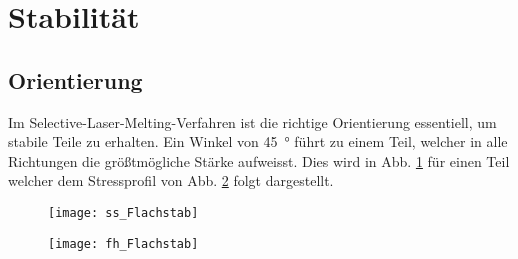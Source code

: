 \documentclass[../main.tex]{subfiles}
\begin{document}
\section{Stabilität}
\subsection{Orientierung}
Im Selective-Laser-Melting-Verfahren ist die richtige Orientierung essentiell, um stabile Teile zu erhalten.
Ein Winkel von \qty{45}{\degree} führt zu einem Teil, welcher in alle Richtungen die größtmögliche Stärke aufweisst. Dies wird in Abb. \ref{img:ss_1} für einen Teil welcher dem Stressprofil von Abb. \ref{img:fh_1} folgt dargestellt.

\begin{figure}[h]
	\centering
	\texttt{[image: ss\_Flachstab]}
	\label{img:ss_1}
\end{figure}
\begin{figure}[h]
	\centering
	\texttt{[image: fh\_Flachstab]}
	\label{img:fh_1}
\end{figure}
\end{document}

